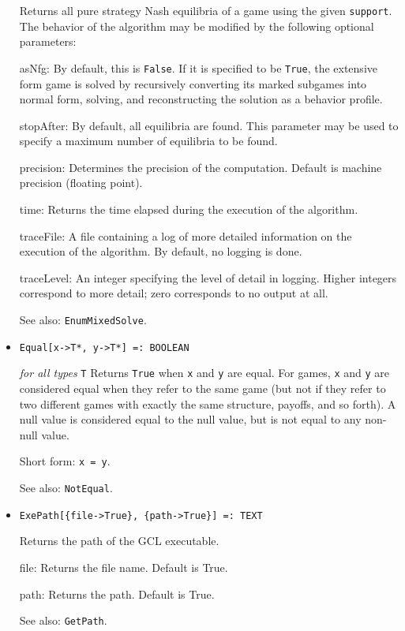 \begin{itemize}
\bd
Returns all pure strategy Nash equilibria of a game using the given
\verb+support+.  The behavior
of the algorithm may be modified by the following optional parameters:
\bd
\item
[asNfg:] By default, this is \verb+False+.  If it is specified to be
\verb+True+, the extensive form game is solved by recursively converting
its marked subgames into normal form, solving, and reconstructing the
solution as a behavior profile.
\item
[stopAfter:] By default, all equilibria are found.  This parameter may
be used to specify a maximum number of equilibria to be found.
\item
[precision:] Determines the precision of the computation. Default is
machine precision (floating point). 
\item
[time:] Returns the time elapsed during the execution
of the algorithm.
\item
[traceFile:] A file containing a log of more detailed information on the
execution of the algorithm.  By default, no logging is done.
\item
[traceLevel:] An integer specifying the level of detail in logging.  Higher
integers correspond to more detail; zero corresponds to no output at all.
\ed
\item
[See also:] \verb+EnumMixedSolve+.
\ed

\item{}
\protect \large \begin{verbatim}
Equal[x->T*, y->T*] =: BOOLEAN
\end{verbatim}\normalsize

{\it for all types} {\tt T}
\bd
Returns \verb+True+ when \verb+x+ and \verb+y+ are equal.  For games,
\verb+x+ and \verb+y+ are considered equal when they refer to the same
game (but not if they refer to two different games with exactly the
same structure, payoffs, and so forth).  A null value is considered equal
to the null value, but is not equal to any non-null value.
\item
[Short form:] \verb+x = y+.
\item
[See also:] \verb+NotEqual+.
\ed

\item{}
\protect \large \begin{verbatim}
ExePath[{file->True}, {path->True}] =: TEXT 
\end{verbatim} \normalsize

\bd
Returns the path of the GCL executable. 
\bd
\item [file:] Returns the file name.  Default is True.  
\item [path:] Returns the path.  Default is True. 
\ed
\item [See also:] \verb+GetPath+.
\ed


\end{itemize}
